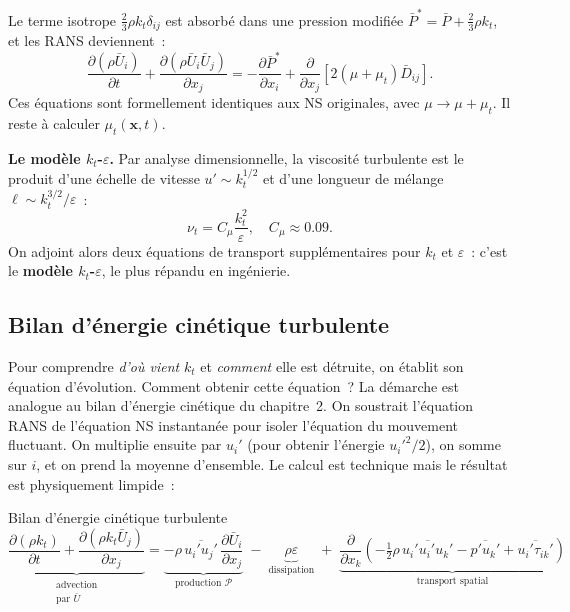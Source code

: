 \documentclass[11pt,a4paper]{report}
\begin{document}
Le terme isotrope $\frac{2}{3}\rho k_t\delta_{ij}$ est absorb\'e dans une pression modifi\'ee
$\bar{P}^* = \bar{P} + \frac{2}{3}\rho k_t$, et les RANS deviennent~:
\[
  \frac{\partial(\rho\bar{U}_i)}{\partial t}
  + \frac{\partial(\rho\bar{U}_i\bar{U}_j)}{\partial x_j}
  = -\frac{\partial\bar{P}^*}{\partial x_i}
  + \frac{\partial}{\partial x_j}\!\left[2(\mu+\mu_t)\bar{D}_{ij}\right].
\]
Ces \'equations sont formellement identiques aux NS originales, avec $\mu \to \mu + \mu_t$.
Il reste \`a calculer $\mu_t(\bm{x},t)$.

\medskip
\noindent\textbf{Le mod\`ele $k_t$-$\varepsilon$.}
Par analyse dimensionnelle, la viscosit\'e turbulente est le produit d'une \'echelle de vitesse
$u' \sim k_t^{1/2}$ et d'une longueur de m\'elange $\ell \sim k_t^{3/2}/\varepsilon$~:
\[
  \nu_t = C_\mu\frac{k_t^2}{\varepsilon}, \quad C_\mu \approx 0.09.
\]
On adjoint alors deux \'equations de transport suppl\'ementaires pour $k_t$ et $\varepsilon$~:
c'est le \textbf{mod\`ele $k_t$-$\varepsilon$}, le plus r\'epandu en ing\'enierie.

\subsection{Bilan d'\'energie cin\'etique turbulente}

Pour comprendre \emph{d'o\`u vient} $k_t$ et \emph{comment} elle est d\'etruite, on \'etablit
son \'equation d'\'evolution. Comment obtenir cette \'equation~? La d\'emarche est analogue au
bilan d'\'energie cin\'etique du chapitre~2. On soustrait l'\'equation RANS de l'\'equation NS
instantan\'ee pour isoler l'\'equation du mouvement fluctuant. On multiplie ensuite par $u_i'$
(pour obtenir l'\'energie $u_i'^2/2$), on somme sur $i$, et on prend la moyenne d'ensemble.
Le calcul est technique mais le r\'esultat est physiquement limpide~:

\begin{importantbox}{Bilan d'\'energie cin\'etique turbulente}
\[
  \underbrace{\frac{\partial(\rho k_t)}{\partial t}
  + \frac{\partial(\rho k_t \bar{U}_j)}{\partial x_j}}_{\substack{\text{advection} \\
  \text{par }\bar{U}}}
  =
  \underbrace{-\rho\,\overline{u_i'u_j'}\,\frac{\partial\bar{U}_i}{\partial x_j}}_{\text{production }\mathcal{P}}
  \;-\; \underbrace{\rho\varepsilon}_{\text{dissipation}}
  \;+\; \underbrace{\frac{\partial}{\partial x_k}\!\left(
    -\tfrac{1}{2}\rho\,\overline{u_i'u_i'u_k'}
    - \overline{p'u_k'} + \overline{u_i'\tau_{ik}'}
  \right)}_{\text{transport spatial}}
\]
\end{importantbox}
\end{document}
